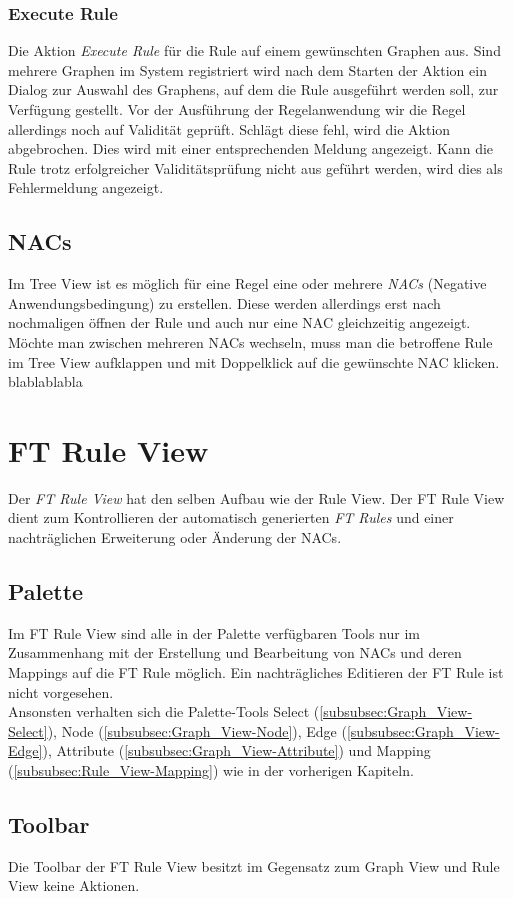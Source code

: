 \subsubsection{Execute Rule}
Die Aktion \emph{Execute Rule} für die Rule auf einem gewünschten Graphen aus. Sind mehrere Graphen im System registriert wird nach dem Starten der Aktion ein Dialog zur Auswahl des Graphens, auf dem die Rule ausgeführt werden soll, zur Verfügung gestellt. Vor der Ausführung der Regelanwendung wir die Regel allerdings noch auf Validität geprüft. Schlägt diese fehl, wird die Aktion abgebrochen. Dies wird mit einer entsprechenden Meldung angezeigt. Kann die Rule trotz erfolgreicher Validitätsprüfung nicht aus geführt werden, wird dies als Fehlermeldung angezeigt.

\subsection{NACs}
Im Tree View ist es möglich für eine Regel eine oder mehrere \emph{NACs} (Negative Anwendungsbedingung) zu erstellen. Diese werden allerdings erst nach nochmaligen öffnen der Rule und auch nur eine NAC gleichzeitig angezeigt. Möchte man zwischen mehreren NACs wechseln, muss man die betroffene Rule im Tree View aufklappen und mit Doppelklick auf die gewünschte NAC klicken.\\
blablablabla

\section{FT Rule View}
Der \emph{FT Rule View} hat den selben Aufbau wie der Rule View. Der FT Rule View dient zum Kontrollieren der automatisch generierten \emph{FT Rules} und einer nachträglichen Erweiterung oder Änderung der NACs. 

\subsection{Palette}
Im FT Rule View sind alle in der Palette verfügbaren Tools nur im Zusammenhang mit der Erstellung und Bearbeitung von NACs und deren Mappings auf die FT Rule möglich. Ein nachträgliches Editieren der FT Rule ist nicht vorgesehen. \\
Ansonsten verhalten sich die Palette-Tools Select (\ref{subsubsec:Graph_View-Select}), Node (\ref{subsubsec:Graph_View-Node}), Edge (\ref{subsubsec:Graph_View-Edge}), Attribute (\ref{subsubsec:Graph_View-Attribute}) und Mapping (\ref{subsubsec:Rule_View-Mapping}) wie in der vorherigen Kapiteln.

\subsection{Toolbar}
Die Toolbar der FT Rule View besitzt im Gegensatz zum Graph View und Rule View keine Aktionen.
